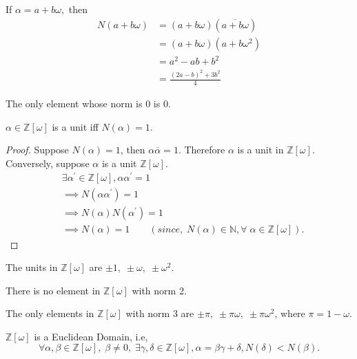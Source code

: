 \documentclass[10pt,a4paper]{article}
\begin{document}
\begin{remark}
If $\alpha = a+b\omega,$ then 
\begin{align*}
N(a+b\omega) &= (a+b\omega)(\overline{a+b\omega}) \\
&= (a+b\omega)(a+b{\omega}^{2}) \\
&= a^2 - ab + b^2 \\
&= \frac{(2a-b)^2+3{b^2}}{4}
\end{align*}
\end{remark}

\begin{remark}
The only element whose norm is 0 is 0.
\end{remark}

\begin{prop}
$\alpha \in \mathbb{Z}[\omega]$ is a unit iff $N(\alpha) = 1$.
\end{prop}

\begin{proof}
Suppose $N(\alpha) = 1$, then ${\alpha}\overline{\alpha} = 1$. Therefore $\alpha$ is a unit in $\mathbb{Z}[\omega]$. \\
Conversely, suppose $\alpha$ is a unit $\mathbb{Z}[\omega]$.
\begin{align*}
&\exists {\alpha}^{\prime} \in \mathbb{Z}[\omega], \alpha{\alpha}^{\prime} = 1 \\
&\implies N(\alpha{\alpha}^{\prime}) = 1 \\
&\implies N(\alpha)N({\alpha}^{\prime}) = 1 \\
&\implies N(\alpha)= 1 \qquad(since,\; N(\alpha) \in \mathbb{N}, \forall\; \alpha \in \mathbb{Z}[\omega]).
\end{align*}
\end{proof}

\begin{theorem}
The units in $\mathbb{Z}[\omega]$ are $\pm 1,\;\pm \omega,\;\pm {\omega}^{2}$.
\end{theorem}

\begin{theorem}
There is no element in $\mathbb{Z}[\omega]$ with norm 2.
\end{theorem}

\begin{theorem}
The only elements in $\mathbb{Z}[\omega]$ with norm 3 are $\pm \pi,\;\pm \pi\omega,\;\pm \pi{\omega}^{2}$, where $\pi = 1-\omega$.
\end{theorem}

\begin{theorem}
$\mathbb{Z}[\omega]$ is a Euclidean Domain, i.e, $$\forall \alpha, \beta \in \mathbb{Z}[\omega],\;\beta\neq 0,\;\exists \gamma,\delta \in \mathbb{Z}[\omega],\alpha=\beta\gamma+\delta, N(\delta)<N(\beta).$$
\end{theorem}
\end{document}
